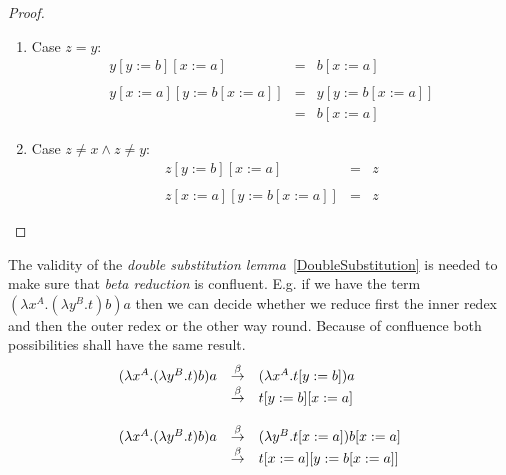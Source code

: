 \begin{theorem}
\begin{proof}
\begin{enumerate}
\begin{enumerate}
                    \item Case $z = y$:
                        $$
                        \begin{array}{llll}
                            y[y:=b][x:=a]
                            &=& b[x:=a]
                            \\
                            \\
                            y[x:=a][y:=b[x:=a]]
                            &=& y[y:=b[x:=a]]
                            \\
                            &=&b[x:=a]
                        \end{array}
                        $$

                    \item Case $z \ne x \land z \ne y$:
                        $$
                        \begin{array}{llll}
                            z[y:=b][x:=a]
                            &=& z
                            \\
                            \\
                            z[x:=a][y:=b[x:=a]]
                            &=& z
                        \end{array}
                        $$

                \end{enumerate}
        \end{enumerate}
    \end{proof}
\end{theorem}

The validity of the
\emph{double substitution lemma}~\ref{DoubleSubstitution}
is needed to make sure that \emph{beta
reduction} is confluent. E.g. if we have the term
$(\lambda x^A. (\lambda y^B. t) b) a$ then we can decide whether we reduce first
the inner redex and then the outer redex or the other way round. Because of
confluence both possibilities shall have the same result.
$$
\begin{array}{llll}
    (\lambda x^A. (\lambda y^B. t) b) a
    &\stackrel{\beta}{\to}& (\lambda x^A. t[y:=b]) a
    \\
    &\stackrel{\beta}{\to}& t[y:=b][x:=a]
    \\
    \\
    (\lambda x^A. (\lambda y^B. t) b) a
    &\stackrel{\beta}{\to}& (\lambda y^B. t[x:=a]) b[x:=a]
    \\
    &\stackrel{\beta}{\to}& t[x:=a][y:=b[x:=a]]
\end{array}
$$


